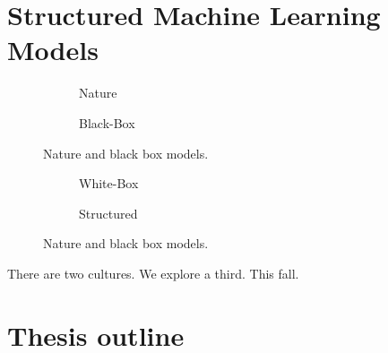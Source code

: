 \section{Structured Machine Learning Models}
\begin{figure}[t]
    \begin{subfigure}[b]{\halffigurewidth}
        \centering
        \caption{
            \label{fig:introduction:models:nature}
            Nature
        }
    \end{subfigure}
    \hfill
    \begin{subfigure}[b]{\halffigurewidth}
        \centering
        \caption{
            \label{fig:introduction:models:black_box}
            Black-Box
        }
    \end{subfigure}
    \caption{
        \label{fig:introduction:models:one}
        Nature and black box models.
    }
\end{figure}
\begin{figure}[t]
    \begin{subfigure}[b]{\halffigurewidth}
        \centering
        \caption{
            \label{fig:introduction:models:white_box}
            White-Box
        }
    \end{subfigure}
    \hfill
    \begin{subfigure}[b]{\halffigurewidth}
        \centering
        \caption{
            \label{fig:introduction:models:structured}
            Structured
        }
    \end{subfigure}
    \caption{
        \label{fig:introduction:models:two}
        Nature and black box models.
    }
\end{figure}
There are two cultures.
We explore a third.
This fall.


\section{Thesis outline}


